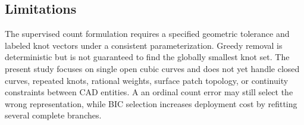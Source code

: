 \subsection{Limitations}

The supervised count formulation requires a specified geometric tolerance and
labeled knot vectors under a consistent parameterization. Greedy removal is
deterministic but is not guaranteed to find the globally smallest knot set.
The present study focuses on single open cubic
curves and does not yet handle closed curves, repeated knots, rational weights,
surface patch topology, or continuity constraints between CAD entities. A
an ordinal count error may still select the wrong representation, while BIC
selection increases deployment cost by refitting several complete branches.
